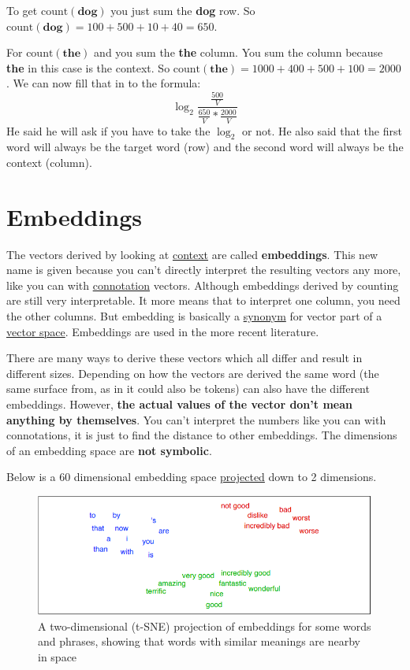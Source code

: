 \documentclass[
  11pt,
  british,
]{article}
\begin{document}
To get \(\text{count}(\textbf{dog})\) you just sum the \textbf{dog} row.
So \(\text{count}(\textbf{dog}) = 100 + 500 + 10 + 40 = 650\).

For \(\text{count}(\textbf{the})\) and you sum the \textbf{the} column.
You sum the column because \textbf{the} in this case is the context. So
\(\text{count}(\textbf{the}) = 1000 + 400 + 500 + 100 = 2000\). We can
now fill that in to the formula:
\[\log_2\frac{\frac{500}{V}}{\frac{650}{V}*\frac{2000}{V}}\] He said he
will ask if you have to take the \(\log_2\) or not. He also said that
the first word will always be the target word (row) and the second word
will always be the context (column).

\hypertarget{embeddings}{%
\section{Embeddings}\label{embeddings}}

The vectors derived by looking at \href{Context.md}{context} are called
\textbf{embeddings}. This new name is given because you can't directly
interpret the resulting vectors any more, like you can with
\href{Connotations.md}{connotation} vectors. Although embeddings derived
by counting are still very interpretable. It more means that to
interpret one column, you need the other columns. But embedding is
basically a \href{../Languages/Synonyms.md}{synonym} for vector part of
a \href{Vector\%20Space.md}{vector space}. Embeddings are used in the
more recent literature.

There are many ways to derive these vectors which all differ and result
in different sizes. Depending on how the vectors are derived the same
word (the same surface from, as in it could also be tokens) can also
have the different embeddings. However, \textbf{the actual values of the
vector don't mean anything by themselves}. You can't interpret the
numbers like you can with connotations, it is just to find the distance
to other embeddings. The dimensions of an embedding space are
\textbf{not symbolic}.

Below is a 60 dimensional embedding space
\href{Dimensionality\%20reduction.md}{projected} down to 2 dimensions.

\begin{figure}
\centering
\includegraphics{Pasted_image_20220601145459.png}
\caption{A two-dimensional (t-SNE) projection of embeddings for some
words and phrases, showing that words with similar meanings are nearby
in space}
\end{figure}
\end{document}
